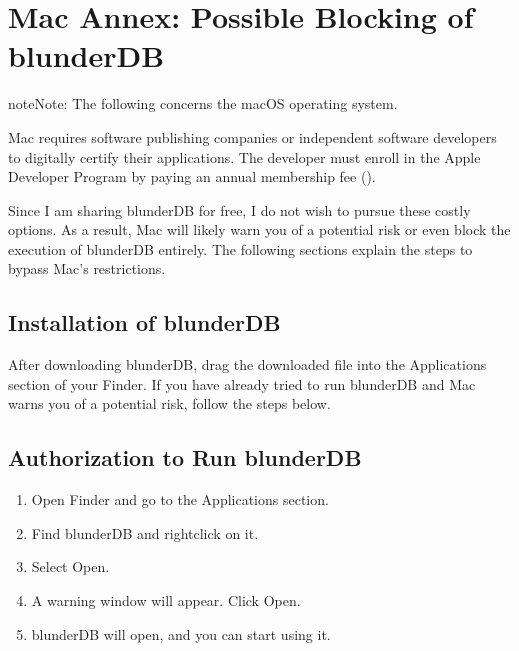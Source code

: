 \documentclass[letterpaper,10pt,english]{sphinxmanual}
\begin{document}
\sphinxstepscope


\section{Mac Annex: Possible Blocking of blunderDB}
\label{\detokenize{annexe_mac_securite:annexe-mac-blocage-eventuel-de-blunderdb}}\label{\detokenize{annexe_mac_securite:annexe-mac-malware}}\label{\detokenize{annexe_mac_securite::doc}}
\begin{sphinxadmonition}{note}{Note:}
\sphinxAtStartPar
The following concerns the macOS operating system.
\end{sphinxadmonition}

\sphinxAtStartPar
Mac requires software publishing companies or independent software developers to digitally certify their applications. The developer must enroll in the Apple Developer Program by paying an annual membership fee ().

\sphinxAtStartPar
Since I am sharing blunderDB for free, I do not wish to pursue these costly options. As a result, Mac will likely warn you of a potential risk or even block the execution of blunderDB entirely. The following sections explain the steps to bypass Mac’s restrictions.


\subsection{Installation of blunderDB}
\label{\detokenize{annexe_mac_securite:installation-de-blunderdb}}
\sphinxAtStartPar
After downloading blunderDB, drag the downloaded file into the Applications section of your Finder. If you have already tried to run blunderDB and Mac warns you of a potential risk, follow the steps below.


\subsection{Authorization to Run blunderDB}
\label{\detokenize{annexe_mac_securite:autorisation-de-l-execution-de-blunderdb}}\begin{enumerate}
%
\item {} 
\sphinxAtStartPar
Open Finder and go to the Applications section.

\item {} 
\sphinxAtStartPar
Find blunderDB and right\sphinxhyphen{}click on it.

\item {} 
\sphinxAtStartPar
Select Open.

\item {} 
\sphinxAtStartPar
A warning window will appear. Click Open.

\item {} 
\sphinxAtStartPar
blunderDB will open, and you can start using it.

\end{enumerate}
\end{document}
